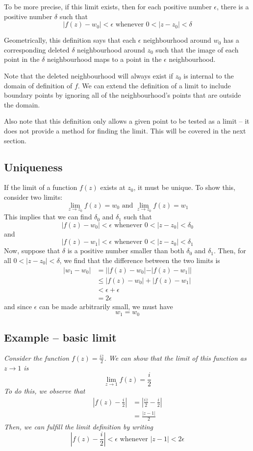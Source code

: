 \documentclass{article}
\renewcommand{\bar}{\overline}
\begin{document}
To be more precise, if this limit exists, then for each positive number $\epsilon$, there is a positive number $\delta$ such that
\[
	|f(z) - w_0| < \epsilon \text{ whenever } 0 < |z - z_0| < \delta
\]

Geometrically, this definition says that each $\epsilon$ neighbourhood around $w_0$ has a corresponding deleted $\delta$ neighbourhood around $z_0$ such that the image of each point in the $\delta$ neighbourhood maps to a point in the $\epsilon$ neighbourhood.

Note that the deleted neighbourhood will always exist if $z_0$ is internal to the domain of definition of $f$. We can extend the definition of a limit to include boundary points by ignoring all of the neighbourhood's points that are outside the domain.

Also note that this definition only allows a given point to be tested as a limit -- it does not provide a method for finding the limit. This will be covered in the next section.

\subsection{Uniqueness}
If the limit of a function $f(z)$ exists at $z_0$, it must be unique. To show this, consider two limits:
\[
	\lim_{z \to z_0} f(z) = w_0 \text{ and } \lim_{z \to z_0} f(z) = w_1
\]
This implies that we can find $\delta_0$ and $\delta_1$ such that
\[
	|f(z) - w_0| < \epsilon \text{ whenever } 0 < |z - z_0| < \delta_0
\]
and
\[
	|f(z) - w_1| < \epsilon \text{ whenever } 0 < |z - z_0| < \delta_1
\]
Now, suppose that $\delta$ is a positive number smaller than both $\delta_0$ and $\delta_1$. Then, for all $0 < |z - z_0| < \delta$, we find that the difference between the two limits is
\begin{align*}
	|w_1 - w_0| &= ||f(z) - w_0| - |f(z) - w_1|| \\
	& \le |f(z) - w_0| + |f(z) - w_1| \\
	& < \epsilon + \epsilon \\
	& = 2\epsilon
\end{align*}
and since $\epsilon$ can be made arbitrarily small, we must have
\[
	w_1 = w_0
\] 


\subsection{Example -- basic limit}
\textit{
Consider the function $f(z) = \frac{i \bar{z}}{2}$. We can show that the limit of this function as $z \to 1$ is
\[
	\lim_{z \to 1} f(z) = \frac{i}{2}
\]
To do this, we observe that
\begin{align*}
	\left| f(z) - \frac{i}{2} \right| 
	&= \left| \frac{i \bar{z}}{2} - \frac{i}{2} \right| \\
	&= \frac{|z - 1|}{2}
\end{align*}
Then, we can fulfill the limit definition by writing
\[
	\left| f(z) - \frac{i}{2} \right| < \epsilon \text{ whenever } \left| z - 1\right| < 2\epsilon
\]
}
\end{document}
